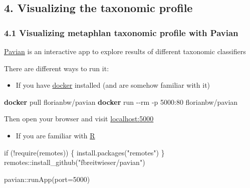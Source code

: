 \documentclass[
  letterpaper,
]{book}
\newenvironment{Shaded}{}{}
\newcommand{\AttributeTok}[1]{\textcolor[rgb]{0.84,0.23,0.29}{#1}}
\newcommand{\ControlFlowTok}[1]{\textcolor[rgb]{0.84,0.23,0.29}{#1}}
\newcommand{\DecValTok}[1]{\textcolor[rgb]{0.00,0.36,0.77}{#1}}
\newcommand{\ExtensionTok}[1]{\textcolor[rgb]{0.84,0.23,0.29}{\textbf{#1}}}
\newcommand{\FunctionTok}[1]{\textcolor[rgb]{0.44,0.26,0.76}{#1}}
\newcommand{\NormalTok}[1]{\textcolor[rgb]{0.14,0.16,0.18}{#1}}
\newcommand{\SpecialCharTok}[1]{\textcolor[rgb]{0.00,0.36,0.77}{#1}}
\newcommand{\StringTok}[1]{\textcolor[rgb]{0.01,0.18,0.38}{#1}}
\providecommand{\tightlist}{%
  \setlength{\itemsep}{0pt}\setlength{\parskip}{0pt}}\usepackage{longtable,booktabs,array}
\begin{document}
\hypertarget{visualizing-the-taxonomic-profile}{%
\subsection{4. Visualizing the taxonomic
profile}\label{visualizing-the-taxonomic-profile}}

\hypertarget{visualizing-metaphlan-taxonomic-profile-with-pavian}{%
\subsubsection{4.1 Visualizing metaphlan taxonomic profile with
Pavian}\label{visualizing-metaphlan-taxonomic-profile-with-pavian}}

\href{https://github.com/fbreitwieser/pavian}{Pavian} is an interactive
app to explore results of different taxonomic classifiers

There are different ways to run it:

\begin{itemize}
\tightlist
\item
  If you have \href{https://www.docker.com/}{docker} installed (and are
  somehow familiar with it)
\end{itemize}

\begin{Shaded}
\begin{Highlighting}[]
\ExtensionTok{docker}\NormalTok{ pull }\StringTok{\textquotesingle{}florianbw/pavian\textquotesingle{}}
\ExtensionTok{docker}\NormalTok{ run }\AttributeTok{{-}{-}rm} \AttributeTok{{-}p}\NormalTok{ 5000:80 florianbw/pavian}
\end{Highlighting}
\end{Shaded}

Then open your browser and visit \url{localhost:5000}

\begin{itemize}
\tightlist
\item
  If you are familiar with \href{https://www.r-project.org/}{R}
\end{itemize}

\begin{Shaded}
\begin{Highlighting}[]
\ControlFlowTok{if}\NormalTok{ (}\SpecialCharTok{!}\FunctionTok{require}\NormalTok{(remotes)) \{ }\FunctionTok{install.packages}\NormalTok{(}\StringTok{"remotes"}\NormalTok{) \}}
\NormalTok{remotes}\SpecialCharTok{::}\FunctionTok{install\_github}\NormalTok{(}\StringTok{"fbreitwieser/pavian"}\NormalTok{)}

\NormalTok{pavian}\SpecialCharTok{::}\FunctionTok{runApp}\NormalTok{(}\AttributeTok{port=}\DecValTok{5000}\NormalTok{)}
\end{Highlighting}
\end{Shaded}
\end{document}
